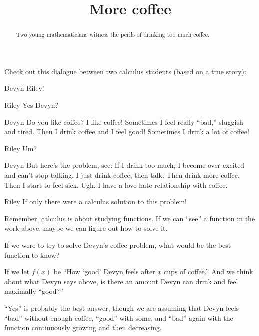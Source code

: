 \documentclass{ximera}
\title[Break-Ground:]{More coffee}
\begin{document}
\begin{abstract}
Two young mathematicians witness the perils of drinking too much
coffee.
\end{abstract}
\maketitle

Check out this dialogue between two calculus students (based on a true
story):

\begin{dialogue}
\item[Devyn] Riley! 
\item[Riley] Yes Devyn?
\item[Devyn] Do you like coffee? I like coffee! Sometimes I feel
  really ``bad,'' sluggish and tired. Then I drink coffee and I feel
  good! Sometimes I drink a lot of coffee!
\item[Riley] Um?
\item[Devyn] But here's the problem, see: If I drink too much, I
  become over excited and can't stop talking. I just drink coffee,
  then talk. Then drink more coffee. Then I start to feel sick. Ugh. I
  have a love-hate relationship with coffee.
\item[Riley] If only there were a calculus solution to this problem!
\end{dialogue}

Remember, calculus is about studying functions. If we can ``see'' a function in the work above, maybe we can figure out how to solve it. 

\begin{problem}
  If we were to try to solve Devyn's coffee problem, what would be the best
  function to know?
  \begin{multipleChoice}
  \end{multipleChoice}
\begin{problem}
  If we let $f(x)$ be ``How `good' Devyn feels after $x$ cups of
  coffee.'' And we think about what Devyn says above, is there an amount Devyn can drink and feel maximally ``good?''
  \begin{multipleChoice}
  \end{multipleChoice}
  \begin{feedback}
    ``Yes'' is probably the best answer, though we are assuming that
    Devyn feels ``bad'' without enough coffee, ``good'' with some, and
    ``bad'' again with the function continuously growing and then
    decreasing.
  \end{feedback}
\end{problem}
\end{problem}
\end{document}
